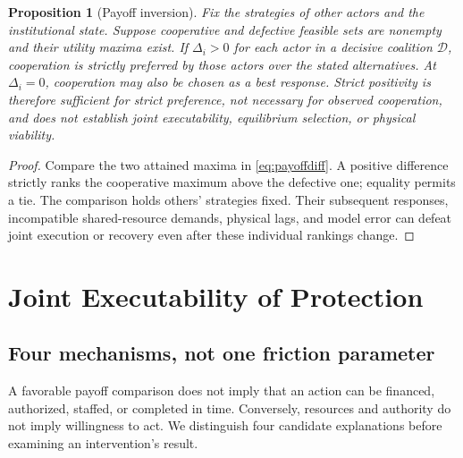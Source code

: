 \documentclass[11pt,a4paper]{article}
\numberwithin{equation}{section}
\theoremstyle{definition}
\theoremstyle{plain}
\newtheorem{proposition}[definition]{Proposition}
\theoremstyle{remark}
\begin{document}
\begin{proposition}[Payoff inversion]
Fix the strategies of other actors and the institutional state. Suppose cooperative and defective feasible sets are nonempty and their utility maxima exist. If $\Delta_i>0$ for each actor in a decisive coalition $\mathcal D$, cooperation is strictly preferred by those actors over the stated alternatives. At $\Delta_i=0$, cooperation may also be chosen as a best response. Strict positivity is therefore sufficient for strict preference, not necessary for observed cooperation, and does not establish joint executability, equilibrium selection, or physical viability.
\end{proposition}

\begin{proof}
Compare the two attained maxima in \cref{eq:payoffdiff}. A positive difference strictly ranks the cooperative maximum above the defective one; equality permits a tie. The comparison holds others' strategies fixed. Their subsequent responses, incompatible shared-resource demands, physical lags, and model error can defeat joint execution or recovery even after these individual rankings change.
\end{proof}

\section{Joint Executability of Protection}
\label{sec:executability}

\subsection{Four mechanisms, not one friction parameter}

A favorable payoff comparison does not imply that an action can be financed, authorized, staffed, or completed in time. Conversely, resources and authority do not imply willingness to act. We distinguish four candidate explanations before examining an intervention's result.
\end{document}
